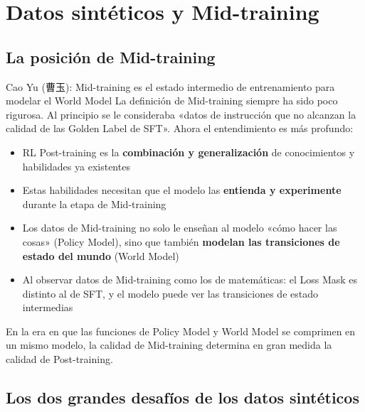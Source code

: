 \section{Datos sintéticos y Mid-training}

\subsection{La posición de Mid-training}

\begin{importantbox}{Cao Yu (曹玉): Mid-training es el estado intermedio de entrenamiento para modelar el World Model}
La definición de Mid-training siempre ha sido poco rigurosa. Al principio se le consideraba «datos de instrucción que no alcanzan la calidad de las Golden Label de SFT». Ahora el entendimiento es más profundo:
\begin{itemize}
  \item RL Post-training es la \textbf{combinación y generalización} de conocimientos y habilidades ya existentes
  \item Estas habilidades necesitan que el modelo las \textbf{entienda y experimente} durante la etapa de Mid-training
  \item Los datos de Mid-training no solo le enseñan al modelo «cómo hacer las cosas» (Policy Model), sino que también \textbf{modelan las transiciones de estado del mundo} (World Model)
  \item Al observar datos de Mid-training como los de matemáticas: el Loss Mask es distinto al de SFT, y el modelo puede ver las transiciones de estado intermedias
\end{itemize}
En la era en que las funciones de Policy Model y World Model se comprimen en un mismo modelo, la calidad de Mid-training determina en gran medida la calidad de Post-training.
\end{importantbox}

\subsection{Los dos grandes desafíos de los datos sintéticos}


